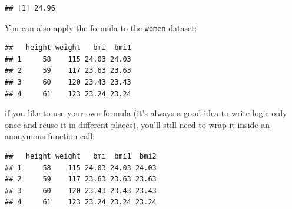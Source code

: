 \documentclass[]{book}
\newenvironment{Shaded}{\begin{snugshade}}{\end{snugshade}}
\newcommand{\ControlFlowTok}[1]{\textcolor[rgb]{0.13,0.29,0.53}{\textbf{#1}}}
\newcommand{\DataTypeTok}[1]{\textcolor[rgb]{0.13,0.29,0.53}{#1}}
\newcommand{\DecValTok}[1]{\textcolor[rgb]{0.00,0.00,0.81}{#1}}
\newcommand{\KeywordTok}[1]{\textcolor[rgb]{0.13,0.29,0.53}{\textbf{#1}}}
\newcommand{\NormalTok}[1]{#1}
\newcommand{\OperatorTok}[1]{\textcolor[rgb]{0.81,0.36,0.00}{\textbf{#1}}}
\newcommand{\StringTok}[1]{\textcolor[rgb]{0.31,0.60,0.02}{#1}}
\begin{document}
\begin{verbatim}
## [1] 24.96
\end{verbatim}

You can also apply the formula to the \texttt{women} dataset:

\begin{Shaded}
\end{Shaded}

\begin{verbatim}
##   height weight   bmi  bmi1
## 1     58    115 24.03 24.03
## 2     59    117 23.63 23.63
## 3     60    120 23.43 23.43
## 4     61    123 23.24 23.24
\end{verbatim}

if you like to use your own formula (it's always a good idea to write logic only once and reuse it in different places), you'll still need to wrap it inside an anonymous function call:

\begin{Shaded}
\end{Shaded}

\begin{verbatim}
##   height weight   bmi  bmi1  bmi2
## 1     58    115 24.03 24.03 24.03
## 2     59    117 23.63 23.63 23.63
## 3     60    120 23.43 23.43 23.43
## 4     61    123 23.24 23.24 23.24
\end{verbatim}
\end{document}
